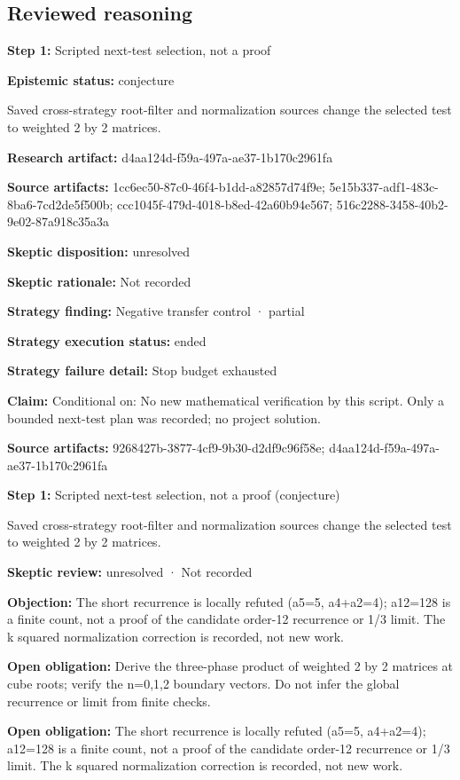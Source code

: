 \documentclass[11pt]{article}
\begin{document}
\subsection{Reviewed reasoning}
\textbf{Step 1:} Scripted next-test selection, not a proof\par
\textbf{Epistemic status:} conjecture\par
Saved cross-strategy root-filter and normalization sources change the selected test to weighted 2 by 2 matrices.\par
\textbf{Research artifact:} d4aa124d-f59a-497a-ae37-1b170c2961fa\par
\textbf{Source artifacts:} 1cc6ec50-87c0-46f4-b1dd-a82857d74f9e; 5e15b337-adf1-483c-8ba6-7cd2de5f500b; ccc1045f-479d-4018-b8ed-42a60b94e567; 516c2288-3458-40b2-9e02-87a918c35a3a\par
\textbf{Skeptic disposition:} unresolved\par
\textbf{Skeptic rationale:} Not recorded\par
\textbf{Strategy finding:} Negative transfer control · partial\par
\textbf{Strategy execution status:} ended\par
\textbf{Strategy failure detail:} Stop budget exhausted\par
\textbf{Claim:} Conditional on: No new mathematical verification by this script. Only a bounded next-test plan was recorded; no project solution.\par
\textbf{Source artifacts:} 9268427b-3877-4cf9-9b30-d2df9c96f58e; d4aa124d-f59a-497a-ae37-1b170c2961fa\par
\textbf{Step 1:} Scripted next-test selection, not a proof (conjecture)\par
Saved cross-strategy root-filter and normalization sources change the selected test to weighted 2 by 2 matrices.\par
\textbf{Skeptic review:} unresolved · Not recorded\par
\textbf{Objection:} The short recurrence is locally refuted (a5=5, a4+a2=4); a12=128 is a finite count, not a proof of the candidate order-12 recurrence or 1/3 limit. The k squared normalization correction is recorded, not new work.\par
\textbf{Open obligation:} Derive the three-phase product of weighted 2 by 2 matrices at cube roots; verify the n=0,1,2 boundary vectors. Do not infer the global recurrence or limit from finite checks.\par
\textbf{Open obligation:} The short recurrence is locally refuted (a5=5, a4+a2=4); a12=128 is a finite count, not a proof of the candidate order-12 recurrence or 1/3 limit. The k squared normalization correction is recorded, not new work.\par
\end{document}

